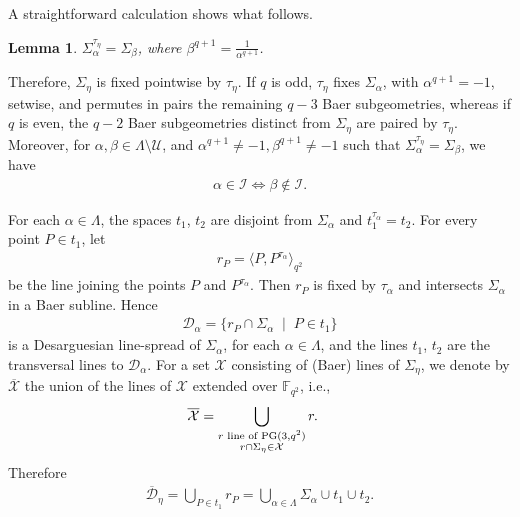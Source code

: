 \documentclass[11pt]{article}
\newtheorem{lemma}[theorem]{Lemma}
\theoremstyle{definition}
\numberwithin{equation}{section}
\def\cI{\mathcal I}
\def\cD{\mathcal D}
\def\cU{\mathcal U}
\def\cX{\mathcal X}
\def\PG{{\rm PG}}
\def\F{{\mathbb F}}
\begin{document}
A straightforward calculation shows what follows.
\begin{lemma}\label{lemmasub}
$\Sigma_{\alpha}^{\tau_{\eta}} = \Sigma_{\beta}$, where $\beta^{q+1} = \frac{1}{\alpha^{q+1}}$.
\end{lemma}
Therefore, $\Sigma_{\eta}$ is fixed pointwise by $\tau_{\eta}$. If $q$ is odd, $\tau_{\eta}$ fixes $\Sigma_{\alpha}$, with $\alpha^{q+1} = -1$, setwise, and permutes in pairs the remaining $q-3$ Baer subgeometries, whereas if $q$ is even, the $q-2$ Baer subgeometries distinct from $\Sigma_{\eta}$ are paired by $\tau_{\eta}$. Moreover, for $\alpha,\beta \in \Lambda \setminus \cU$, and $\alpha^{q+1} \neq -1,\beta^{q+1} \neq -1$ such that $\Sigma_{\alpha}^{\tau_{\eta}} = \Sigma_{\beta}$, we have 
\begin{align}
    \alpha \in \cI \iff \beta \not\in \cI. \label{indici}
\end{align}

For each $\alpha \in \Lambda$, the spaces $t_1$, $t_2$ are disjoint from $\Sigma_{\alpha}$ and $t_1^{\tau_{\alpha}} = t_2$. For every point $P \in t_1$, let 
\begin{align*}
r_P = \langle P, P^{\tau_{\alpha}} \rangle_{q^2}
\end{align*}
be the line joining the points $P$ and $P^{\tau_{\alpha}}$. Then $r_{P}$ is fixed by $\tau_{\alpha}$ and intersects $\Sigma_{\alpha}$ in a Baer subline. Hence 
\begin{align*}
\cD_{\alpha} = \{ r_P \cap \Sigma_{\alpha} \;\; | \;\; P \in t_1 \}
\end{align*} 
is a Desarguesian line-spread of $\Sigma_{\alpha}$, for each $\alpha \in \Lambda$, and the lines $t_1$, $t_2$ are the transversal lines to $\cD_{\alpha}$.
For a set $\cX$ consisting of (Baer) lines of $\Sigma_{\eta}$, we denote by $\overline{\cX}$ the union of the lines of $\cX$ extended over $\F_{q^2}$, i.e., 
\begin{align*}
& \overline{\cX} = \bigcup_{\substack{r \mbox{\scriptsize{ line of }} \PG(3, q^2) \\ r \cap \Sigma_{\eta} \in \cX}} r.
\end{align*}
Therefore 
\begin{align*}
\overline{\cD}_{\eta} = \bigcup_{P \in t_1} r_{P} = \bigcup_{\alpha \in \Lambda} \Sigma_{\alpha} \cup t_1 \cup t_2.
\end{align*}
\end{document}
